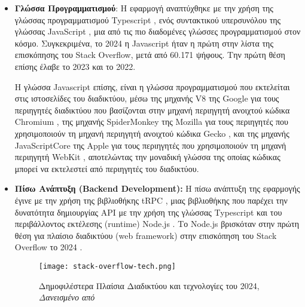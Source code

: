 \begin{itemize}
  \item
    \textbf{Γλώσσα Προγραμματισμού}: Η εφαρμογή αναπτύχθηκε με την χρήση
    της γλώσσας προγραμματισμού \textlatin{Typescript} \cite{typescript},
    ενός συντακτικού υπερσυνόλου της γλώσσας \textlatin{JavaScript}
    \cite{javascript}, μια από τις πιο διαδομένες γλώσσες προγραμματισμού
    στον κόσμο. \cite{tiobe, languagechart} Συγκεκριμένα, το 2024 η
    \textlatin{Javascript} ήταν η πρώτη στην λίστα της επισκόπησης του
    \textlatin{Stack Overflow}, μετά από 60.171 ψήφους. \cite{so2024} Την
    πρώτη θέση επίσης έλαβε το 2023 και το 2022. \cite{so2022,so2023}

    Η γλώσσα \textlatin{Javascript} επίσης, είναι η γλώσσα προγραμματισμού
    που εκτελείται στις ιστοσελίδες του διαδικτύου, μέσω της μηχανής
    \textlatin{V8} της \textlatin{Google} \cite{v8} για τους περιηγητές
    διαδικτύου που βασίζονται στην μηχανή περιηγητή ανοιχτού κώδικα
    \textlatin{Chromium} \cite{chromium}, της μηχανής
    \textlatin{SpiderMonkey} της \textlatin{Mozilla} \cite{spidermonkey}
    για τους περιηγητές που χρησιμοποιούν τη μηχανή περιηγητή ανοιχτού
    κώδικα \textlatin{Gecko} \cite{gecko}, και της μηχανής
    \textlatin{JavaScriptCore} της \textlatin{Apple} \cite{javascriptcore}
    για τους περιηγητές που χρησιμοποιούν τη μηχανή περιηγητή
    \textlatin{WebKit} \cite{webkit}, αποτελώντας την μοναδική γλώσσα της οποίας
    κώδικας μπορεί να εκτελεστεί από περιηγητές του διαδικτύου.
  \item
    \textbf{Πίσω Ανάπτυξη (\textlatin{Backend Development}):} Η πίσω
    ανάπτυξη της εφαρμογής έγινε με την χρήση της βιβλιοθήκης
    \textlatin{tRPC} \cite{trpc}, μιας βιβλιοθήκης που παρέχει την
    δυνατότητα δημιουργίας \textlatin{API} με την χρήση της γλώσσας
    \textlatin{Typescript} και του περιβάλλοντος εκτέλεσης
    (\textlatin{runtime}) \textlatin{Node.js} \cite{node}. Το
    \textlatin{Node.js} βρισκόταν στην πρώτη θέση για πλαίσιο διαδικτύου
    (\textlatin{web framework}) στην επισκόπηση του \textlatin{Stack
    Overflow} το 2024 \cite{so2024}.
    \begin{figure}[H]
      \begin{center}
        \texttt{[image: stack-overflow-tech.png]}
        \caption{Δημοφιλέστερα Πλαίσια Διαδικτύου και τεχνολογίες του
        2024, \textit{Δανεισμένο από \cite{so2024}}}
      \end{center}
      \label{fig:SO2024FRAMEWORKS}
    \end{figure}


\end{itemize}
